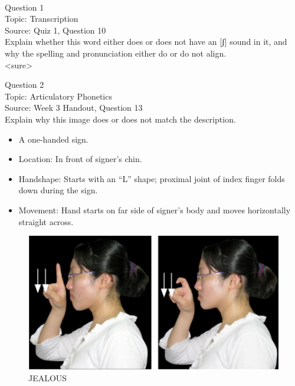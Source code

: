 \documentclass[12pt]{article}
\begin{document}
\newpage

\begin{center}
\textbf{{\color{red}{\HUGE END OF EXAM}}}\\

\end{center}
\newpage

\begin{center}
\textbf{{\color{blue}{\HUGE START OF EXAM\\}}}

\textbf{{\color{blue}{\HUGE Student ID: 34785\\}}}

\textbf{{\color{blue}{\HUGE \\}}}

\end{center}
\newpage

{\large Question 1}\\

Topic: Transcription\\
Source: Quiz 1, Question 10\\

Explain whether this word either does or does not have an [ʃ] sound in it, and why the spelling and pronunciation either do or do not align.\\

<sure>


\newpage

{\large Question 2}\\

Topic: Articulatory Phonetics\\
Source: Week 3 Handout, Question 13\\

Explain why this image does or does not match the description.\\

\begin{itemize} \item A one-handed sign. \item Location: In front of signer’s chin. \item Handshape: Starts with an “L” shape; proximal joint of index finger folds down during the sign. \item Movement: Hand starts on far side of signer’s body and moves horizontally straight across. \end{itemize}

\begin{figure}[H]
\includegraphics{../images/taiwansign_jealous.png}
\caption{JEALOUS}
\end{figure}
\end{document}
